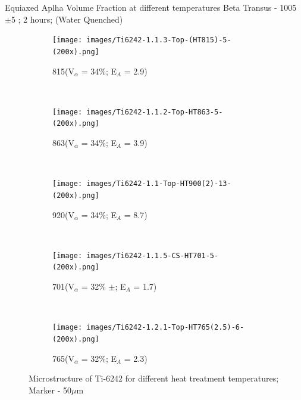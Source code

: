\documentclass[10pt]{beamer}
\begin{document}

\begin{frame}{Equiaxed Aplha Volume Fraction at different temperatures}
Beta Transus - 1005 $\pm$5 \degC ; 2 hours; (Water Quenched)

\vspace{-10mm}

\begin{figure}[H]
    \centering
    \begin{subfigure}{0.25\textwidth}
        \texttt{[image: images/Ti6242-1.1.3-Top-(HT815)-5-(200x).png]}
        \caption{815\degC (V$_{\alpha}$ = 34\%; E$_{A}$ = 2.9)}
        \label{fig:Ti-6242 HT815}
    \end{subfigure}
    ~
    \begin{subfigure}{0.25\textwidth}
        \texttt{[image: images/Ti6242-1.1.2-Top-HT863-5-(200x).png]}
        \caption{863\degC (V$_{\alpha}$ = 34\%; E$_{A}$ = 3.9)}
        \label{fig:Ti-6242 HT863}
    \end{subfigure}
    ~
    \begin{subfigure}{0.25\textwidth}
        \texttt{[image: images/Ti6242-1.1-Top-HT900(2)-13-(200x).png]}
        \caption{920\degC (V$_{\alpha}$ = 34\%; E$_{A}$ = 8.7)}
        \label{fig:Ti-6242 HT920}
    \end{subfigure}   
    \\
        \begin{subfigure}{0.25\textwidth}
        \texttt{[image: images/Ti6242-1.1.5-CS-HT701-5-(200x).png]}
        \caption{701\degC (V$_{\alpha}$ = 32\% $\pm$; E$_{A}$ = 1.7)}
        \label{fig:Ti-6242 HT700}
    \end{subfigure}    
    ~
    \begin{subfigure}{0.25\textwidth}
        \texttt{[image: images/Ti6242-1.2.1-Top-HT765(2.5)-6-(200x).png]}
        \caption{765\degC (V$_{\alpha}$ = 32\%; E$_{A}$ = 2.3)}
        \label{fig:Ti-6242 HT752}
    \end{subfigure}      
   
    \caption{Microstructure of Ti-6242 for different heat treatment temperatures; Marker - 50$\mu$m}
    
\end{figure}
\end{frame}


\end{document}
